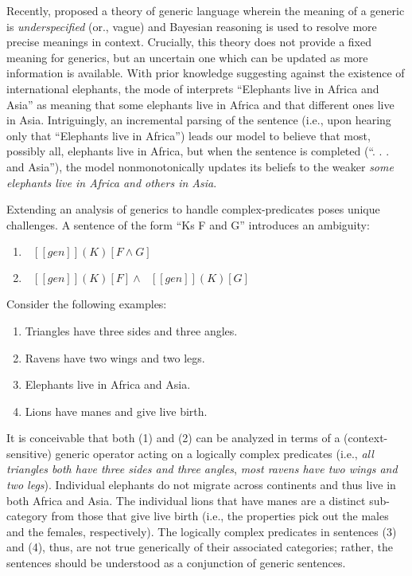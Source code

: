 \documentclass[10pt,letterpaper]{article}
\providecommand{\tightlist}{%
  \setlength{\itemsep}{0pt}\setlength{\parskip}{0pt}}
\newcommand{\denote}[1]{\mbox{ $[\![ #1 ]\!]$}}
\begin{document}
Recently, \cite{Tessler2019:genLang} proposed a theory of generic language wherein the meaning of a generic is \emph{underspecified} (or., vague) and Bayesian reasoning is used to resolve more precise meanings in context.
Crucially, this theory does not provide a fixed meaning for generics, but an uncertain one which can be updated as more information is available.
With prior knowledge suggesting against the existence of international elephants, the mode of  interprets ``Elephants live in Africa and Asia” as meaning that some elephants live in Africa and that different ones live in Asia. 
Intriguingly, an incremental parsing of the sentence (i.e., upon hearing only that ``Elephants live in Africa'') leads our model to believe that most, possibly all, elephants live in Africa, but when the sentence is completed (``. . . and Asia''), the model nonmonotonically updates its beliefs to the weaker \emph{some elephants live in Africa and others in Asia}. 



Extending an analysis of generics to handle complex-predicates poses unique challenges.
A sentence of the form ``Ks F and G'' introduces an ambiguity:

\begin{enumerate}
\item $\denote{gen}(K) [F \land G]$
\item $\denote{gen}(K) [F] \land \denote{gen}(K) [G]$
\end{enumerate}

Consider the following examples:

\begin{enumerate}
\tightlist
\item Triangles have three sides and three angles.
\item Ravens have two wings and two legs.
\item Elephants live in Africa and Asia.
\item Lions have manes and give live birth.
\end{enumerate}

It is conceivable that both (1) and (2) can be analyzed in terms of a (context-sensitive) generic operator acting on a logically complex predicates (i.e., \emph{all triangles both have three sides and three angles}, \emph{most ravens have two wings and two legs}). 
Individual elephants do not migrate across continents and thus live in both Africa and Asia. 
The individual lions that have manes are a distinct sub-category from those that give live birth (i.e., the properties pick out the males and the females, respectively). 
The logically complex predicates in sentences (3) and (4), thus, are not true generically of their associated categories; rather, the sentences should be understood as a conjunction of generic sentences.
\end{document}

